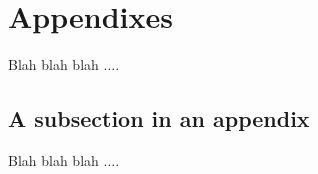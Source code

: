 \appendix

\section{Appendixes}
Blah blah blah ....

\subsection{\label{app:subsec}A subsection in an appendix}
Blah blah blah ....
